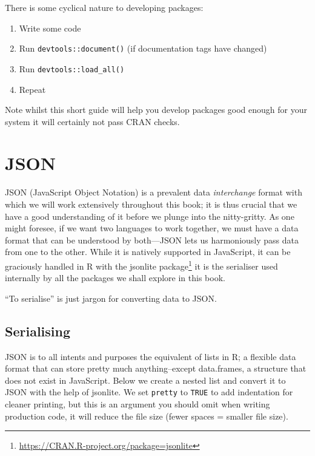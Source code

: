\documentclass[10pt,]{krantz}
\makeatletter
\providecommand{\tightlist}{%
  \setlength{\itemsep}{0pt}\setlength{\parskip}{0pt}}
\renewcommand{\href}[2]{#2\footnote{\url{#1}}}
\newenvironment{kframe}{%
\medskip{}
\setlength{\fboxsep}{.8em}
 \def\at@end@of@kframe{}%
 \ifinner\ifhmode%
  \def\at@end@of@kframe{\end{minipage}}%
  \begin{minipage}{\columnwidth}%
 \fi\fi%
 \def\FrameCommand##1{\hskip\@totalleftmargin \hskip-\fboxsep
 \colorbox{shadecolor}{##1}\hskip-\fboxsep
     \hskip-\linewidth \hskip-\@totalleftmargin \hskip\columnwidth}%
 \MakeFramed {\advance\hsize-\width
   \@totalleftmargin\z@ \linewidth\hsize
   \@setminipage}}%
 {\par\unskip\endMakeFramed%
 \at@end@of@kframe}
\newenvironment{rmdblock}[1]
  {
  \begin{itemize}
  \renewcommand{\labelitemi}{
    \raisebox{-.7\height}[0pt][0pt]{
      {\setkeys{Gin}{width=3em,keepaspectratio}\texttt{[image: images/\#1]}}
    }
  }
  \setlength{\fboxsep}{1em}
  \begin{kframe}
  \item
  }
  {
  \end{kframe}
  \end{itemize}
  }
\newenvironment{rmdnote}
  {\begin{rmdblock}{note}}
  {\end{rmdblock}}
\makeatother
\begin{document}
There is some cyclical nature to developing packages:

\begin{enumerate}
\def\labelenumi{\arabic{enumi}.}
\tightlist
\item
  Write some code
\item
  Run \texttt{devtools::document()} (if documentation tags have changed)
\item
  Run \texttt{devtools::load\_all()}
\item
  Repeat
\end{enumerate}

Note whilst this short guide will help you develop packages good enough for your system it will certainly not pass CRAN checks.

\hypertarget{basics-json}{%
\section{JSON}\label{basics-json}}

JSON (JavaScript Object Notation) is a prevalent data \emph{interchange} format with which we will work extensively throughout this book; it is thus crucial that we have a good understanding of it before we plunge into the nitty-gritty. As one might foresee, if we want two languages to work together, we must have a data format that can be understood by both---JSON lets us harmoniously pass data from one to the other. While it is natively supported in JavaScript, it can be graciously handled in R with the \href{https://CRAN.R-project.org/package=jsonlite}{jsonlite package} \citep{R-jsonlite} it is the serialiser used internally by all the packages we shall explore in this book.

\begin{rmdnote}
``To serialise'' is just jargon for converting data to JSON.
\end{rmdnote}

\hypertarget{serialising}{%
\subsection{Serialising}\label{serialising}}

JSON is to all intents and purposes the equivalent of lists in R; a flexible data format that can store pretty much anything--except data.frames, a structure that does not exist in JavaScript. Below we create a nested list and convert it to JSON with the help of jsonlite. We set \texttt{pretty} to \texttt{TRUE} to add indentation for cleaner printing, but this is an argument you should omit when writing production code, it will reduce the file size (fewer spaces = smaller file size).
\end{document}
